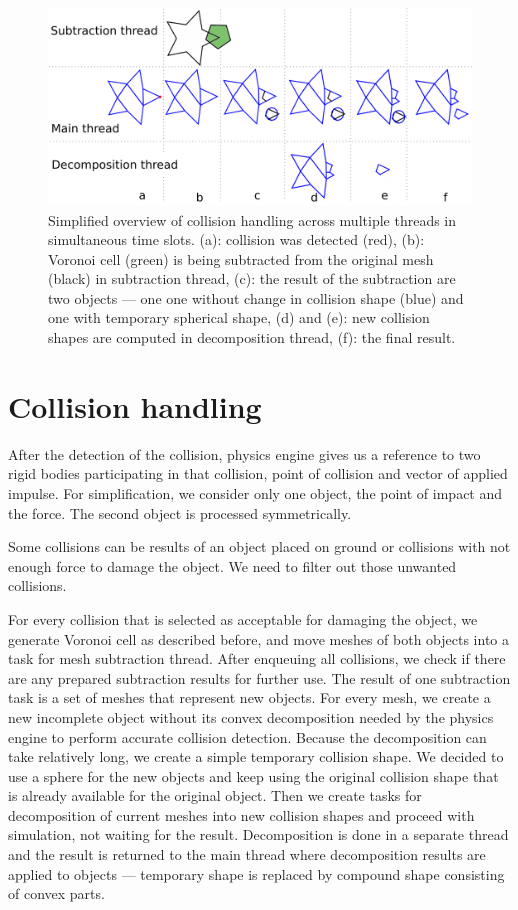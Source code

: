 \begin{figure}
        \centering
        \includegraphics[width=\textwidth]{img/object-progress}
       \caption{Simplified overview of collision handling across multiple threads in simultaneous time slots. (a): collision was detected (red), (b): Voronoi cell (green) is being subtracted from the original mesh (black) in subtraction thread, (c): the result of the subtraction are two objects --- one one without change in collision shape (blue) and one with temporary spherical shape, (d) and (e): new collision shapes are computed in decomposition thread, (f): the final result.}
        \label{fig:objectInThreads}
\end{figure}

\section{Collision handling}
\label{sec:collisions}
After the detection of the collision, physics engine gives us a reference to two rigid bodies participating in that collision, point of collision and vector of applied impulse. For simplification, we consider only one object, the point of impact and the force. The second object is processed symmetrically.

Some collisions can be results of an object placed on ground or collisions with not enough force to damage the object. We need to filter out those unwanted collisions.

For every collision that is selected as acceptable for damaging the object, we generate Voronoi cell as described before, and move meshes of both objects into a task for mesh subtraction thread. After enqueuing all collisions, we check if there are any prepared subtraction results for further use. The result of one subtraction task is a set of meshes that represent new objects. For every mesh, we create a new incomplete object without its convex decomposition needed by the physics engine to perform accurate collision detection. Because the decomposition can take relatively long, we create a simple temporary collision shape. We decided to use a sphere for the new objects and keep using the original collision shape that is already available for the original object. Then we create tasks for decomposition of current meshes into new collision shapes and proceed with simulation, not waiting for the result. Decomposition is done in a separate thread and the result is returned to the main thread where decomposition results are applied to objects --- temporary shape is replaced by compound shape consisting of convex parts.

